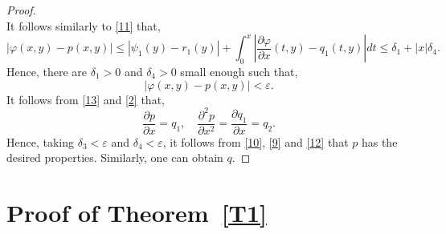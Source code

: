\documentclass[11pt]{amsart}
\begin{document}
\begin{proof}
\begin{equation}
\end{equation}
It follows similarly to \eqref{11} that,
	\[|\varphi(x,y)-p(x,y)|\leqslant|\psi_1(y)-r_1(y)|+\int_{0}^{x}\left|\frac{\partial\varphi}{\partial x}(t,y)-q_1(t,y)\right|dt\leqslant\delta_1+|x|\delta_4.\]
Hence, there are $\delta_1>0$ and $\delta_4>0$ small enough such that,
\begin{equation}\label{12}
	|\varphi(x,y)-p(x,y)|<\varepsilon.
\end{equation}
It follows from \eqref{13} and \eqref{2} that,
	\[\frac{\partial p}{\partial x}=q_1, \quad \frac{\partial^2p}{\partial x^2}=\frac{\partial q_1}{\partial x}=q_2.\]
Hence, taking $\delta_3<\varepsilon$ and $\delta_4<\varepsilon$, it follows from \eqref{10}, \eqref{9} and \eqref{12} that $p$ has the desired properties. Similarly, one can obtain $q$. \end{proof}

\section{Proof of Theorem~\ref{T1}}\label{Sec4}
\end{document}

